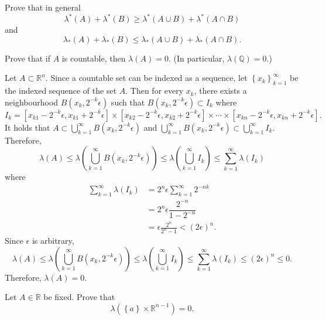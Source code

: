 \documentclass[answers]{exam}
\begin{document}
\begin{questions}
\begin{solution}
   \end{solution}
   \question
   Prove that in general
   $$
   \lambda^{*}\left(A\right) + \lambda^{*}\left(B\right) \geq \lambda^{*}\left(A\cup B\right)+\lambda^{*}\left(A \cap B\right)
   $$
   and
   $$
   \lambda_{*}\left(A\right) + \lambda_{*}\left(B\right) \leq \lambda_{*}\left(A\cup B\right)+\lambda_{*}\left(A \cap B\right).
   $$
   \begin{solution}

   \end{solution}
   \question
   Prove that if $A$ is countable, then $\lambda\left(A\right)= 0$. (In particular, $\lambda\left(\mathbb{Q}\right)=0$.)
   \begin{solution}
   Let $A \subset \mathbb{R}^{n}$. Since a countable set can be indexed as a sequence, let $\left\{x_{k} \right\}_{k=1}^{\infty}$ be the indexed sequence of the set $A$. Then for every $x_{k}$, there exists a neighbourhood $B\left(x_{k}, 2^{-k}\epsilon\right)$ such that $B\left(x_{k},2^{-k}\epsilon\right) \subset I_{k}$ where
   $$
   I_{k} = \left[x_{k1}-2^{-k}\epsilon, x_{k1}+2^{-k}\epsilon\right]\times \left[x_{k2}-2^{-k}\epsilon, x_{k2}+2^{-k}\epsilon\right] \times \cdots \times \left[x_{kn}-2^{-k}\epsilon, x_{kn}+2^{-k}\epsilon\right].
   $$
   It holds that $A \subset \bigcup_{k=1}^{\infty}B\left(x_{k},2^{-k}\epsilon\right)$ and $\bigcup_{k=1}^{\infty}B\left(x_{k},2^{-k}\epsilon\right) \subset \bigcup_{k=1}^{\infty}I_{k}$. Therefore,
   $$
   \lambda\left(A\right) \leq \lambda\left(\bigcup_{k=1}^{\infty}B\left(x_{k},2^{-k}\epsilon\right)\right) \leq \lambda\left(\bigcup_{k=1}^{\infty}I_{k}\right)\leq \sum_{k=1}^{\infty}\lambda\left(I_{k}\right) 
   $$
   where
   \begin{align*}
   \sum_{k=1}^{\infty}\lambda\left(I_{k}\right) &= 2^{n}\epsilon\sum_{k=1}^{\infty}2^{-nk}\\
   &= 2^{n}\epsilon \dfrac{2^{-n}}{1-2^{-n}}\\
   &= \epsilon \frac{2^{n}}{2^{n}-1} < \left(2\epsilon\right)^{n}.
   \end{align*}
   Since $\epsilon$ is arbitrary, 
   $$
   \lambda\left(A\right) \leq \lambda\left(\bigcup_{k=1}^{\infty}B\left(x_{k},2^{-k}\epsilon\right)\right) \leq \lambda\left(\bigcup_{k=1}^{\infty}I_{k}\right)\leq \sum_{k=1}^{\infty}\lambda\left(I_{k}\right) \leq \left(2\epsilon\right)^{n} \leq 0.
   $$
   Therefore, $\lambda\left(A\right) = 0$.
   \end{solution}
   \question
   Let $A \in \mathbb{R}$ be fixed. Prove that
   $$
   \lambda\left(\left\{a \right\} \times \mathbb{R}^{n-1} \right) = 0.
   $$
   \begin{solution}


\end{solution}
\end{questions}
\end{document}
